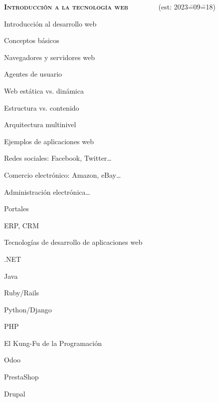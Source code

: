 \begin{longenum}
    \item \textbf{\textsc{Introducción a la tecnología web}} \ \ \ \ \ \ \ \ (est: 2023\==09\==18)
    \begin{longenum}
        \item Introducción al desarrollo web
        \begin{longenum}
            \item Conceptos básicos
            \begin{longenum}
                \item Navegadores y servidores web
                \item Agentes de usuario
                \item Web estática vs. dinámica
                \item Estructura vs. contenido
                \item Arquitectura multinivel
            \end{longenum}
            \item Ejemplos de aplicaciones web
            \begin{longenum}
                \item Redes sociales: Facebook, Twitter…
                \item Comercio electrónico: Amazon, eBay…
                \item Administración electrónica…
                \item Portales
                \item ERP, CRM
            \end{longenum}
            \item Tecnologías de desarrollo de aplicaciones web
            \begin{longenum}
                \item .NET
                \item Java
                \item Ruby/Rails
                \item Python/Django
                \item PHP
                \item El Kung-Fu de la Programación
                \begin{longenum}
                    \item Odoo
                    \item PrestaShop
                    \item Drupal

\end{longenum}
\end{longenum}
\end{longenum}
\end{longenum}
\end{longenum}

